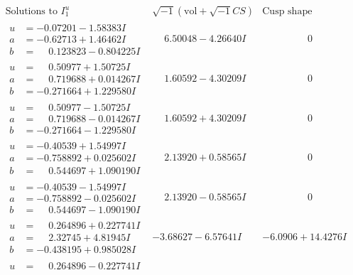 \documentclass[1p]{elsarticle_modified}
\theoremstyle{definition}
\newcommand{\I}{\sqrt{-1}}
\begin{document}
$$\begin{array}{c|c|c}
\text{Solutions to }I^u_{1}& \I (\text{vol} + \sqrt{-1}CS) & \text{Cusp shape}\\
 \hline 
\begin{aligned}
u &= -0.07201 - 1.58383 I \\
a &= -0.62713 + 1.46462 I \\
b &= \phantom{-}0.123823 - 0.804225 I\end{aligned}
 & \phantom{-}6.50048 - 4.26640 I & \phantom{-0.000000 } 0 \\ \hline\begin{aligned}
u &= \phantom{-}0.50977 + 1.50725 I \\
a &= \phantom{-}0.719688 + 0.014267 I \\
b &= -0.271664 + 1.229580 I\end{aligned}
 & \phantom{-}1.60592 - 4.30209 I & \phantom{-0.000000 } 0 \\ \hline\begin{aligned}
u &= \phantom{-}0.50977 - 1.50725 I \\
a &= \phantom{-}0.719688 - 0.014267 I \\
b &= -0.271664 - 1.229580 I\end{aligned}
 & \phantom{-}1.60592 + 4.30209 I & \phantom{-0.000000 } 0 \\ \hline\begin{aligned}
u &= -0.40539 + 1.54997 I \\
a &= -0.758892 + 0.025602 I \\
b &= \phantom{-}0.544697 + 1.090190 I\end{aligned}
 & \phantom{-}2.13920 + 0.58565 I & \phantom{-0.000000 } 0 \\ \hline\begin{aligned}
u &= -0.40539 - 1.54997 I \\
a &= -0.758892 - 0.025602 I \\
b &= \phantom{-}0.544697 - 1.090190 I\end{aligned}
 & \phantom{-}2.13920 - 0.58565 I & \phantom{-0.000000 } 0 \\ \hline\begin{aligned}
u &= \phantom{-}0.264896 + 0.227741 I \\
a &= \phantom{-}2.32745 + 4.81945 I \\
b &= -0.438195 + 0.985028 I\end{aligned}
 & -3.68627 - 6.57641 I & -6.0906 + 14.4276 I \\ \hline\begin{aligned}
u &= \phantom{-}0.264896 - 0.227741 I \\

\end{aligned}
\end{array}$$
\end{document}
